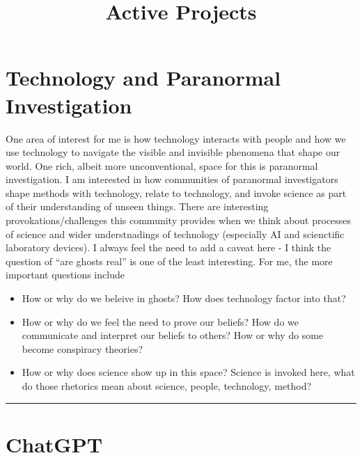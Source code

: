 \documentclass[
]{report}
\title{Active Projects}
\author{}
\date{}
\providecommand{\tightlist}{%
  \setlength{\itemsep}{0pt}\setlength{\parskip}{0pt}}\usepackage{longtable,booktabs,array}
\begin{document}
\maketitle
\ifdefined\Shaded\renewenvironment{Shaded}{\begin{tcolorbox}[interior hidden, breakable, boxrule=0pt, sharp corners, frame hidden, enhanced, borderline west={3pt}{0pt}{shadecolor}]}{\end{tcolorbox}}\fi

\hypertarget{technology-and-paranormal-investigation}{%
\section{Technology and Paranormal
Investigation}\label{technology-and-paranormal-investigation}}

One area of interest for me is how technology interacts with people and
how we use technology to navigate the visible and invisible phenomena
that shape our world. One rich, albeit more unconventional, space for
this is paranormal investigation. I am interested in how communities of
paranormal investigators shape methods with technology, relate to
technology, and invoke science as part of their understanding of unseen
things. There are interesting provokations/challenges this community
provides when we think about processes of science and wider
understnadings of technology (especially AI and scienctific laboratory
devices). I always feel the need to add a caveat here - I think the
question of ``are ghosts real'' is one of the least interesting. For me,
the more important questions include

\begin{itemize}
\tightlist
\item
  How or why do we beleive in ghosts? How does technology factor into
  that?
\item
  How or why do we feel the need to prove our beliefs? How do we
  communicate and interpret our beliefs to others? How or why do some
  become conspiracy theories?
\item
  How or why does science show up in this space? Science is invoked
  here, what do those rhetorics mean about science, people, technology,
  method?
\end{itemize}

\begin{center}\rule{0.5\linewidth}{0.5pt}\end{center}

\hypertarget{chatgpt}{%
\section{ChatGPT}\label{chatgpt}}
\end{document}
